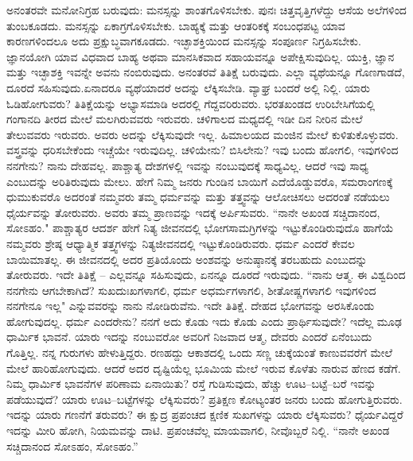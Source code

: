 ಅನಂತರವೇ ಮನೋನಿಗ್ರಹ ಬರುವುದು: ಮನಸ್ಸನ್ನು ಶಾಂತಗೊಳಿಸಬೇಕು. ಪುನಃ ಚಿತ್ತವೃತ್ತಿಗಳೆದ್ದು ಆಸೆಯ ಅಲೆಗಳಿಂದ ತುಂಬಕೂಡದು. ಮನಸ್ಸನ್ನು ಏಕಾಗ್ರಗೊಳಿಸಬೇಕು. ಬಾಹ್ಯಕ್ಕೆ ಮತ್ತು ಆಂತರಿಕಕ್ಕೆ ಸಂಬಂಧಪಟ್ಟ ಯಾವ ಕಾರಣಗಳಿಂದಲೂ ಅದು ಪ್ರಕ್ಷುಬ್ಧವಾಗಕೂಡದು. ಇಚ್ಛಾಶಕ್ತಿಯಿಂದ ಮನಸ್ಸನ್ನು ಸಂಪೂರ್ಣ ನಿಗ್ರಹಿಸಬೇಕು. ಜ್ಞಾನಯೋಗಿ ಯಾವ ವಿಧವಾದ ಬಾಹ್ಯ ಅಥವಾ ಮಾನಸಿಕವಾದ ಸಹಾಯವನ್ನೂ ಅಪೇಕ್ಷಿಸುವುದಿಲ್ಲ. ಯುಕ್ತಿ, ಜ್ಞಾನ ಮತ್ತು ಇಚ್ಛಾಶಕ್ತಿ ಇವನ್ನೇ ಅವನು ನಂಬಿರುವುದು. ಅನಂತರವೆ ತಿತಿಕ್ಷೆ ಬರುವುದು. ಎಲ್ಲಾ ವ್ಯಥೆಯನ್ನೂ ಗೊಣಗಾಡದೆ, ದೂರದೆ ಸಹಿಸುವುದು.\break ಏನಾದರೂ ವ್ಯಥೆಯಾದರೆ ಅದನ್ನು ಲೆಕ್ಕಿಸಬೇಡಿ. ವ್ಯಾಘ್ರ ಬಂದರೆ ಅಲ್ಲಿ ನಿಲ್ಲಿ. ಯಾರು ಓಡಿಹೋಗುವರು? ತಿತಿಕ್ಷೆಯನ್ನು ಅಭ್ಯಾಸಮಾಡಿ ಅದರಲ್ಲಿ ಗೆದ್ದವರಿರುವರು. ಭರತಖಂಡದ ಉರಿಬೇಸಿಗೆಯಲ್ಲಿ ಗಂಗಾನದಿ ತೀರದ ಮೇಲೆ ಮಲಗಿರುವವರು ಇರುವರು. ಚಳಿಗಾಲದ ಮಧ್ಯದಲ್ಲಿ ಇಡೀ ದಿನ ನೀರಿನ ಮೇಲೆ ತೇಲುವವರು ಇರುವರು. ಅವರು ಅದನ್ನು ಲೆಕ್ಕಿಸುವುದೇ ಇಲ್ಲ. ಹಿಮಾಲಯದ ಮಂಜಿನ ಮೇಲೆ ಕುಳಿತುಕೊಳ್ಳುವರು. ವಸ್ತ್ರವನ್ನು ಧರಿಸಬೇಕೆಂದು ಇಚ್ಚೆಯೇ ಇರುವುದಿಲ್ಲ. ಚಳಿಯೇನು? ಬಿಸಿಲೇನು? ಇವು ಬಂದು ಹೋಗಲಿ, ಇವುಗಳಿಂದ ನನಗೇನು? ನಾನು ದೇಹವಲ್ಲ. ಪಾಶ್ಚಾತ್ಯ ದೇಶಗಳಲ್ಲಿ ಇವನ್ನು ನಂಬುವುದಕ್ಕೆ ಸಾಧ್ಯವಿಲ್ಲ. ಆದರೆ ಇವು ಸಾಧ್ಯ ಎಂಬುದನ್ನು ಅರಿತಿರುವುದು ಮೇಲು. ಹೇಗೆ ನಿಮ್ಮ ಜನರು ಗುಂಡಿನ ಬಾಯಿಗೆ ಎದೆಯೊಡ್ಡುವರೊ, ಸಮರಾಂಗಣಕ್ಕೆ ಧುಮುಕುವರೊ ಅದರಂತೆ ನಮ್ಮವರು ತಮ್ಮ ಧರ್ಮವನ್ನು ಮತ್ತು ತತ್ತ್ವವನ್ನು ಆಲೋಚಿಸಲು ಅದರಂತೆ ನಡೆಯಲು ಧೈರ್ಯವನ್ನು ತೋರುವರು. ಅವರು ತಮ್ಮ ಪ್ರಾಣವನ್ನು ಇದಕ್ಕೆ ಅರ್ಪಿಸುವರು. “ನಾನೇ ಅಖಂಡ ಸಚ್ಚಿದಾನಂದ, ಸೋಽಹಂ." ಪಾಶ್ಚಾತ್ಯರ ಆದರ್ಶ ಹೇಗೆ ನಿತ್ಯ ಜೀವನದಲ್ಲಿ ಭೋಗಸಾಮಗ್ರಿಗಳನ್ನು ಇಟ್ಟುಕೊಂಡಿರುವುದೊ ಹಾಗೆಯೆ ನಮ್ಮವರು ಶ್ರೇಷ್ಠ ಆಧ್ಯಾತ್ಮಿಕ ತತ್ತ್ವಗಳನ್ನು ನಿತ್ಯಜೀವನದಲ್ಲಿ ಇಟ್ಟುಕೊಂಡಿರುವರು. ಧರ್ಮ ಎಂದರೆ ಕೇವಲ ಬಾಯಿಮಾತಲ್ಲ. ಈ ಜೀವನದಲ್ಲಿ ಅದರ ಪ್ರತಿಯೊಂದು ಅಂಶವನ್ನು ಅನುಷ್ಠಾನಕ್ಕೆ ತರಬಹುದು ಎಂಬುದನ್ನು ತೋರುವರು. ಇದೇ ತಿತಿಕ್ಷೆ – ಎಲ್ಲವನ್ನೂ ಸಹಿಸುವುದು, ಏನನ್ನೂ ದೂರದೆ ಇರುವುದು. “ನಾನು ಆತ್ಮ. ಈ ವಿಶ್ವದಿಂದ ನನಗೇನು ಆಗಬೇಕಾಗಿದೆ? ಸುಖದುಃಖಗಳಾಗಲಿ, ಧರ್ಮ ಅಧರ್ಮಗಳಾಗಲಿ, ಶೀತೋಷ್ಣಗಳಾಗಲಿ ಇವುಗಳಿಂದ ನನಗೇನೂ ಇಲ್ಲ" ಎನ್ನುವವರನ್ನು ನಾನು ನೋಡಿರುವೆನು. ಇದೇ ತಿತಿಕ್ಷೆ. ದೇಹದ ಭೋಗವನ್ನು ಅರಸಿಕೊಂಡು ಹೋಗುವುದಲ್ಲ. ಧರ್ಮ ಎಂದರೇನು? ನನಗೆ ಅದು ಕೊಡು ಇದು ಕೊಡು ಎಂದು ಪ್ರಾರ್ಥಿಸುವುದೇ? ಇದೆಲ್ಲ ಮೂಢ ಧಾರ್ಮಿಕ ಭಾವನೆ. ಯಾರು ಇದನ್ನು ನಂಬುವರೋ ಅವರಿಗೆ ನಿಜವಾದ ಆತ್ಮ, ದೇವರು ಎಂದರೆ ಏನೆಂಬುದು ಗೊತ್ತಿಲ್ಲ. ನನ್ನ ಗುರುಗಳು ಹೇಳುತ್ತಿದ್ದರು. ರಣಹದ್ದು ಆಕಾಶದಲ್ಲಿ ಒಂದು ಸಣ್ಣ ಚುಕ್ಕೆಯಂತೆ ಕಾಣುವವರೆಗೆ ಮೇಲೆ ಮೇಲೆ ಹಾರಿಹೋಗುವುದು. ಆದರೆ ಅದರ ದೃಷ್ಟಿಯೆಲ್ಲ ಭೂಮಿಯ ಮೇಲೆ ಇರುವ ಕೊಳೆತು ನಾರುವ ಹೆಣದ ಕಡೆಗೆ. ನಿಮ್ಮ ಧಾರ್ಮಿಕ ಭಾವನೆಗಳ ಪರಿಣಾಮ ಏನಾಯಿತು? ರಸ್ತೆ ಗುಡಿಸುವುದು, ಹೆಚ್ಚು ಊಟ–ಬಟ್ಟೆ–ಬರೆ ಇವನ್ನು ಪಡೆಯುವುದೆ? ಯಾರು ಊಟ–ಬಟ್ಟೆಗಳನ್ನು ಲೆಕ್ಕಿಸುವರು? ಪ್ರತಿಕ್ಷಣ ಕೋಟ್ಯಂತರ ಜನರು ಬಂದು ಹೋಗುತ್ತಿರುವರು. ಇದನ್ನು ಯಾರು ಗಣನೆಗೆ ತರುವರು? ಈ ಕ್ಷುದ್ರ ಪ್ರಪಂಚದ ಕ್ಷಣಿಕ ಸುಖಗಳನ್ನು ಯಾರು ಲೆಕ್ಕಿಸುವರು? ಧೈರ್ಯವಿದ್ದರೆ ಇದನ್ನು ಮೀರಿ ಹೋಗಿ, ನಿಯಮವನ್ನು ದಾಟಿ. ಪ್ರಪಂಚವೆಲ್ಲ ಮಾಯವಾಗಲಿ, ನೀವೊಬ್ಬರೆ ನಿಲ್ಲಿ. “ನಾನೇ ಅಖಂಡ ಸಚ್ಚಿದಾನಂದ ಸೋಽಹಂ, ಸೋಽಹಂ.”

